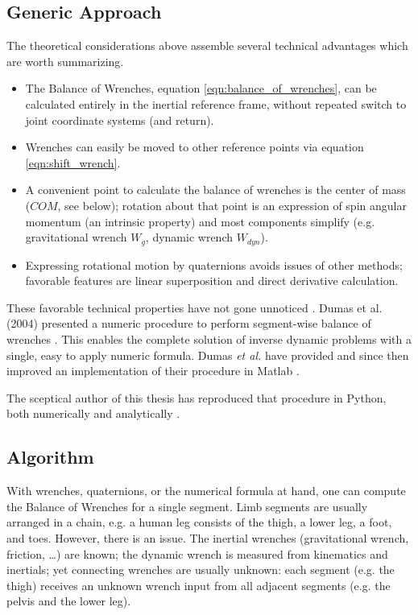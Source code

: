 \subsection{Generic Approach}
\label{sec:org0204502}
The theoretical considerations above assemble several technical advantages which are worth summarizing.
\begin{itemize}
\item The Balance of Wrenches, equation \eqref{eqn:balance_of_wrenches}, can be calculated entirely in the inertial reference frame, without repeated switch to joint coordinate systems (and return).
\item Wrenches can easily be moved to other reference points via equation \eqref{eqn:shift_wrench}.
\item A convenient point to calculate the balance of wrenches is the center of mass (\(COM\), see below); rotation about that point is an expression of spin angular momentum (an intrinsic property) and most components simplify (e.g. gravitational wrench \(W_{g}\), dynamic wrench \(W_{dyn}\)).
\item Expressing rotational motion by quaternions avoids issues of other methods; favorable features are linear superposition and direct derivative calculation.
\end{itemize}

These favorable technical properties have not gone unnoticed \citep{Dumas2004,Dumas2007}.
Dumas et al. (2004) presented a numeric procedure to perform segment-wise balance of wrenches \citep[equation 15 in][]{Dumas2004}.
This enables the complete solution of inverse dynamic problems with a single, easy to apply numeric formula.
Dumas \emph{et al.} have provided and since then improved an implementation of their procedure in Matlab \citep{DumasMatlab}.


The sceptical author of this thesis has reproduced that procedure in Python, both numerically and analytically \citep{Mielke2021id}.


\subsection{Algorithm}
\label{sec:orge6e816e}
With wrenches, quaternions, or the numerical formula at hand, one can compute the Balance of Wrenches for a single segment.
Limb segments are usually arranged in a chain, e.g. a human leg consists of the thigh, a lower leg, a foot, and toes.
However, there is an issue.
The inertial wrenches (gravitational wrench, friction, \ldots{}) are known; the dynamic wrench is measured from kinematics and inertials; yet connecting wrenches are usually unknown: each segment (e.g. the thigh) receives an unknown wrench input from all adjacent segments (e.g. the pelvis and the lower leg).

